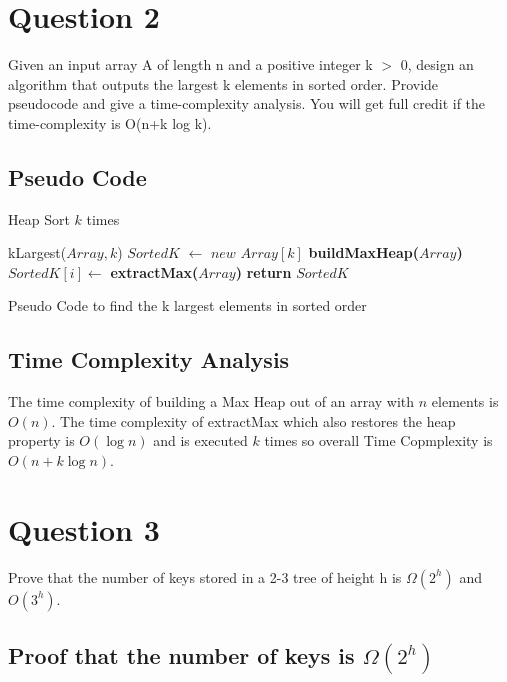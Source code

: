 \documentclass{article}
\begin{document}
\section*{Question 2}
Given an input array A of length n and a positive integer
k $>$ 0, design an algorithm that outputs the largest k elements in sorted
order. Provide pseudocode and give a time-complexity analysis. You will
get full credit if the time-complexity is O(n+k log k).\\

\subsection*{Pseudo Code}

Heap Sort $k$ times
\begin{algorithm}
\begin{algorithmic}
\STATE kLargest($Array, k$)
\STATE $SortedK$ $\gets$ $new$ $Array[k]$ 
\STATE \textbf{buildMaxHeap($Array$)}
		\STATE $SortedK[i] \gets$ \textbf{extractMax($Array$)}
	\ENDFOR
\STATE \textbf{return} $SortedK$
\end{algorithmic}
\caption{Pseudo Code to find the k largest elements in sorted order}
\end{algorithm}

\subsection*{Time Complexity Analysis}
The time complexity of building a Max Heap out of an array with $n$
elements is $O(n)$. The time complexity of extractMax which also
restores the heap property is $O(\log{n})$ and is executed $k$ times so
overall Time Copmplexity is $O(n+k\log{n})$.

\section*{Question 3}
Prove that the number of keys stored in a 2-3 tree of height h
is $\Omega{(2^{h})}$ and $O(3^{h})$.

\subsection*{Proof that the number of keys is $\Omega{(2^h)}$}
\end{document}
